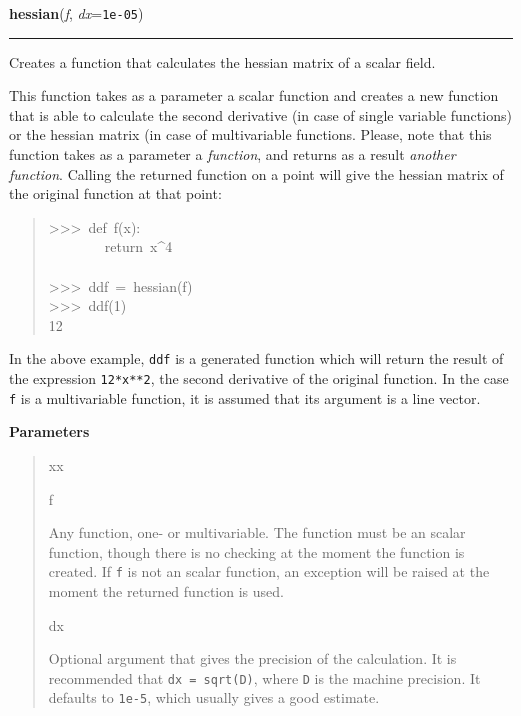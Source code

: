     \begin{boxedminipage}{\textwidth}

    \raggedright \textbf{hessian}(\textit{f}, \textit{dx}=\texttt{1e-05})

    \vspace{-1.5ex}

    \rule{\textwidth}{0.5\fboxrule}

Creates a function that calculates the hessian matrix of a scalar field.

This function takes as a parameter a scalar function and creates a new
function that is able to calculate the second derivative (in case of single
variable functions) or the hessian matrix (in case of multivariable
functions. Please, note that this function takes as a parameter a
\emph{function}, and returns as a result \emph{another function}. Calling the returned
function on a point will give the hessian matrix of the original function
at that point:
\begin{quote}{\ttfamily \raggedright \noindent
>{}>{}>~def~f(x):~\\
~~~~~~~~return~x{\textasciicircum}4~\\
~\\
>{}>{}>~ddf~=~hessian(f)~\\
>{}>{}>~ddf(1)~\\
12
}\end{quote}

In the above example, \texttt{ddf} is a generated function which will return the
result of the expression \texttt{12*x**2}, the second derivative of the original
function. In the case \texttt{f} is a multivariable function, it is assumed that
its argument is a line vector.
    \vspace{1ex}

      \textbf{Parameters}
      \begin{quote}
        \begin{Ventry}{xx}

          \item[f]


Any function, one- or multivariable. The function must be an scalar
function, though there is no checking at the moment the function is
created. If \texttt{f} is not an scalar function, an exception will be
raised at the moment the returned function is used.
          \item[dx]


Optional argument that gives the precision of the calculation. It is
recommended that \texttt{dx = sqrt(D)}, where \texttt{D} is the machine precision.
It defaults to \texttt{1e-5}, which usually gives a good estimate.
        \end{Ventry}


\end{quote}
\end{boxedminipage}

